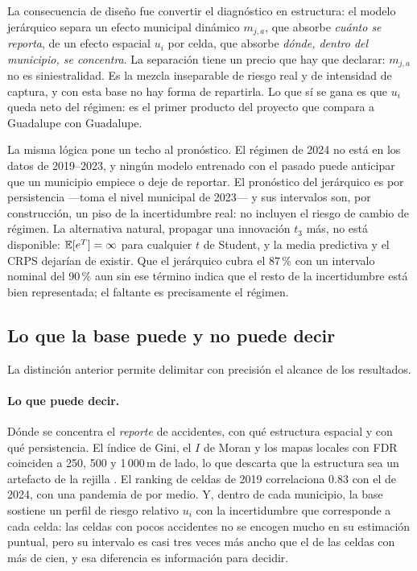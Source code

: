 La consecuencia de diseño fue convertir el diagnóstico en estructura: el
modelo jerárquico separa un efecto municipal dinámico $m_{j,a}$, que absorbe
\emph{cuánto se reporta}, de un efecto espacial $u_i$ por celda, que absorbe
\emph{dónde, dentro del municipio, se concentra}. La separación tiene un
precio que hay que declarar: $m_{j,a}$ no es siniestralidad. Es la mezcla
inseparable de riesgo real y de intensidad de captura, y con esta base no hay
forma de repartirla. Lo que sí se gana es que $u_i$ queda neto del régimen:
es el primer producto del proyecto que compara a Guadalupe con Guadalupe.

La misma lógica pone un techo al pronóstico. El régimen de 2024 no está en los
datos de 2019--2023, y ningún modelo entrenado con el pasado puede anticipar
que un municipio empiece o deje de reportar. El pronóstico del jerárquico es
por persistencia —toma el nivel municipal de 2023— y sus intervalos son, por
construcción, un piso de la incertidumbre real: no incluyen el riesgo de
cambio de régimen. La alternativa natural, propagar una innovación $t_3$ más,
no está disponible: $\mathbb{E}[e^{T}] = \infty$ para cualquier $t$ de Student, y la
media predictiva y el CRPS dejarían de existir. Que el jerárquico cubra el
87\,\% con un intervalo nominal del 90\,\% aun sin ese término indica que el
resto de la incertidumbre está bien representada; el faltante es precisamente
el régimen.

\subsection{Lo que la base puede y no puede decir}\label{sec:disc-alcance}

La distinción anterior permite delimitar con precisión el alcance de los
resultados.

\paragraph{Lo que puede decir.} Dónde se concentra el \emph{reporte} de
accidentes, con qué estructura espacial y con qué persistencia. El índice de
Gini, el $I$ de Moran y los mapas locales con FDR coinciden a 250, 500 y
1\,000\,m de lado, lo que descarta que la estructura sea un artefacto de la
rejilla \parencite{openshaw1984maup}. El ranking de celdas de 2019 correlaciona 0.83
con el de 2024, con una pandemia de por medio. Y, dentro de cada municipio,
la base sostiene un perfil de riesgo relativo $u_i$ con la incertidumbre que
corresponde a cada celda: las celdas con pocos accidentes no se encogen mucho
en su estimación puntual, pero su intervalo es casi tres veces más ancho que el de
las celdas con más de cien, y esa diferencia es información para decidir.

